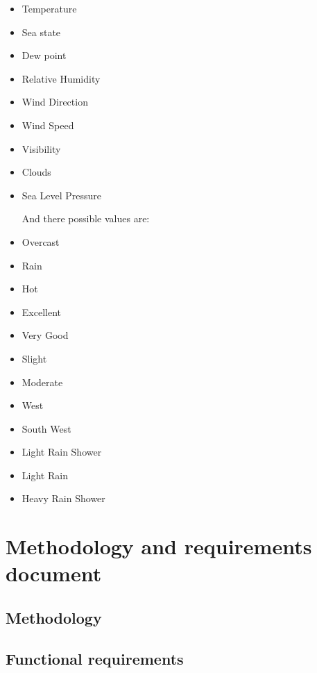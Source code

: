 \documentclass{article}
\begin{document}
\begin{itemize}
\item Temperature 
\item Sea state
\item Dew point
\item Relative Humidity
\item Wind Direction
\item Wind Speed
\item Visibility
\item Clouds 
\item Sea Level Pressure

And there possible values are: 

\item Overcast
\item Rain
\item Hot
\item Excellent
\item Very Good
\item Slight
\item Moderate
\item West
\item South West
\item Light Rain Shower
\item Light Rain
\item Heavy Rain Shower


\end{itemize}
\pagebreak

\section{Methodology and requirements document}
\label{sec:methrecdoc}

\subsection{Methodology}
\label{sec:meth}


\subsection{Functional requirements}
\end{document}
